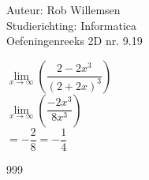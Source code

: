 \documentclass[a4paper]{article}
\begin{document}
\noindent \large Auteur: Rob Willemsen \\
\noindent \large Studierichting: Informatica\\
\noindent \large Oefeningenreeks 2D nr. 9.19\\

\medskip

\normalsize

$\lim\limits_{x \rightarrow \infty} \left(\dfrac{2 - 2x^3}{(2+2x)^3}\right)$ \\

$\lim\limits_{x \rightarrow \infty} \left(\dfrac{-2x^3}{8x^3}\right)$ \\

$= -\dfrac{2}{8} = -\dfrac{1}{4}$ \\

\begin{thebibliography}{999}
\end{thebibliography}
\end{document}
